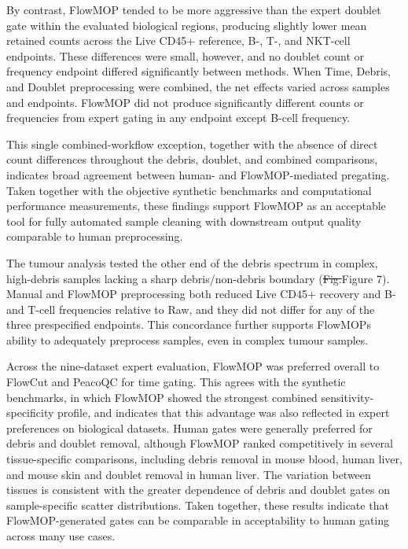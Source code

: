 \documentclass[ASNA]{latex/wiley/USG}
\begin{document}
By contrast, FlowMOP tended to be more aggressive than the expert
doublet gate within the evaluated biological regions, producing slightly
lower mean retained counts across the Live CD45+ reference, B-, T-, and
NKT-cell endpoints. These differences were small, however, and no
doublet count or frequency endpoint differed significantly between
methods. When Time, Debris, and Doublet preprocessing were combined, the
net effects varied across samples and endpoints. FlowMOP did not produce
significantly different counts or frequencies from expert gating in any
endpoint except B-cell frequency.

This single combined-workflow exception, together with the absence of
direct count differences throughout the debris, doublet, and combined
comparisons, indicates broad agreement between human- and
FlowMOP-mediated pregating. Taken together with the objective synthetic
benchmarks and computational performance measurements, these findings
support FlowMOP as an acceptable tool for fully automated sample
cleaning with downstream output quality comparable to human
preprocessing.

The tumour analysis tested the other end of the debris spectrum in
complex, high-debris samples lacking a sharp debris/non-debris boundary
({\color{revisionred}\sout{Fig.}}{\color{revisionblue}Figure} 7). Manual
and FlowMOP preprocessing both reduced Live CD45+ recovery and B- and
T-cell frequencies relative to Raw, and they did not differ for any of
the three prespecified endpoints. This concordance further supports
FlowMOP\textquotesingle s ability to adequately preprocess samples, even
in complex tumour samples.

Across the nine-dataset expert evaluation, FlowMOP was preferred overall
to FlowCut and PeacoQC for time gating. This agrees with the synthetic
benchmarks, in which FlowMOP showed the strongest combined
sensitivity-specificity profile, and indicates that this advantage was
also reflected in expert preferences on biological datasets. Human gates
were generally preferred for debris and doublet removal, although
FlowMOP ranked competitively in several tissue-specific comparisons,
including debris removal in mouse blood, human liver, and mouse skin and
doublet removal in human liver. The variation between tissues is
consistent with the greater dependence of debris and doublet gates on
sample-specific scatter distributions. Taken together, these results
indicate that FlowMOP-generated gates can be comparable in acceptability
to human gating across many use cases.
\end{document}

